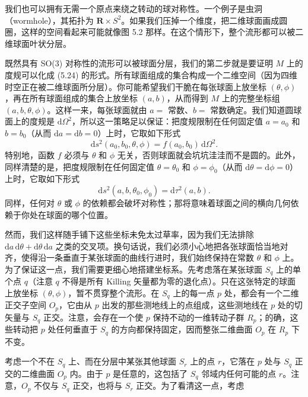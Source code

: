 
我们也可以拥有无需一个原点来绕之转动的球对称性。一个例子是虫洞（wormhole），其拓扑为 $\mathbf{R} \times S^2$。如果我们压掉一个维度，把二维球面画成圆圈，这样的空间看起来可能就像图 5.2 那样。在这个情形下，整个流形都可以被二维球面叶状分层。

既然具有 SO(3) 对称性的流形可以被球面分层，我们的第二步就是要证明 $M$ 上的度规可以化成 (5.24) 的形式。所有球面组成的集合构成一个二维空间（因为四维时空正在被二维球面所分层）。你可能希望我们干脆在每张球面上放坐标 $(\theta, \phi)$，再在所有球面组成的集合上放坐标 $(a, b)$，从而得到 $M$ 上的完整坐标组 $(a, b, \theta, \phi)$。这样一来，每张球面就由 $a = $ 常数、$b = $ 常数确定。我们知道圆球面上的度规是 $\mathrm{d}\Omega^2$，所以这一策略足以保证：把度规限制在任何固定值 $a = a_0$ 和 $b = b_0$（从而 $\mathrm{d}a = \mathrm{d}b = 0$）上时，它取如下形式
\begin{equation*}
\mathrm{d}s^2(a_0, b_0, \theta, \phi) = f(a_0, b_0)\,\mathrm{d}\Omega^2.
\tag{5.27}
\end{equation*}
特别地，函数 $f$ 必须与 $\theta$ 和 $\phi$ 无关，否则球面就会坑坑洼洼而不是圆的。此外，同样清楚的是，把度规限制在任何固定值 $\theta = \theta_0$ 和 $\phi = \phi_0$（从而 $\mathrm{d}\theta = \mathrm{d}\phi = 0$）上时，它取如下形式
\begin{equation*}
\mathrm{d}s^2(a, b, \theta_0, \phi_0) = \mathrm{d}\tau^2(a, b).
\tag{5.28}
\end{equation*}
同样，任何对 $\theta$ 或 $\phi$ 的依赖都会破坏对称性；那将意味着球面之间的横向几何依赖于你处在球面的哪个位置。

然而，我们这样随手铺下这些坐标未免太过草率，因为我们无法排除 $\mathrm{d}a\,\mathrm{d}\theta + \mathrm{d}\theta\,\mathrm{d}a$ 之类的交叉项。换句话说，我们必须小心地把各张球面恰当地对齐，使得沿一条垂直于某张球面的曲线行进时，我们始终保持在常数 $\theta$ 和 $\phi$ 上。为了保证这一点，我们需要更细心地搭建坐标系。先考虑落在某张球面 $S_q$ 上的单个点 $q$（注意 $q$ 不得是所有 Killing 矢量都为零的退化点）。只在这张特定的球面上放坐标 $(\theta, \phi)$，暂不贯穿整个流形。在 $S_q$ 上的每一点 $p$ 处，都会有一个二维正交子空间 $O_p$，它由从 $p$ 出发的那些测地线上的点组成，这些测地线在 $p$ 处的切矢量与 $S_q$ 正交。注意，会存在一个使 $p$ 保持不动的一维转动子群 $R_p$；的确，这些转动把 $p$ 处任何垂直于 $S_q$ 的方向都保持固定，因而整张二维曲面 $O_p$ 在 $R_p$ 下不变。

考虑一个不在 $S_q$ 上、而在分层中某张其他球面 $S_r$ 上的点 $r$，它落在 $p$ 处与 $S_q$ 正交的二维曲面 $O_p$ 内。由于 $p$ 是任意的，这包括了 $S_q$ 邻域内任何可能的点 $r$。注意，$O_p$ 不仅与 $S_q$ 正交，也将与 $S_r$ 正交。为了看清这一点，考虑

